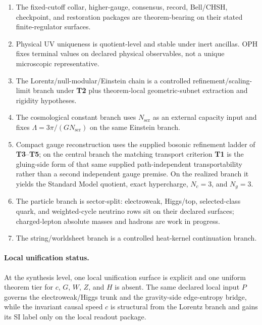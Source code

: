 \begin{enumerate}[leftmargin=2em]
\item The fixed-cutoff collar, higher-gauge, consensus, record, Bell/CHSH, checkpoint, and
restoration packages are theorem-bearing on their stated finite-regulator surfaces.
\item Physical UV uniqueness is quotient-level and stable under inert ancillas. OPH fixes terminal
values on declared physical observables, not a unique microscopic representative.
\item The Lorentz/null-modular/Einstein chain is a controlled refinement/scaling-limit branch
under \textbf{T2} plus theorem-local geometric-subnet extraction and rigidity hypotheses.
\item The cosmological constant branch uses \(N_{\mathrm{scr}}\) as an external capacity input and
fixes \(\Lambda=3\pi/(G N_{\mathrm{scr}})\) on the same Einstein branch.
\item Compact gauge reconstruction uses the supplied bosonic refinement ladder of \textbf{T3}--\textbf{T5}; on the central branch the matching transport criterion \textbf{T1} is the gluing-side form of that same supplied path-independent transportability rather than a second independent gauge premise. On the realized
branch it yields the Standard Model quotient, exact hypercharge, \(N_c=3\), and \(N_g=3\).
\item The particle branch is sector-split: electroweak, Higgs/top, selected-class quark, and
weighted-cycle neutrino rows sit on their declared surfaces; charged-lepton absolute masses and
hadrons are work in progress.
\item The string/worldsheet branch is a controlled heat-kernel continuation branch.
\end{enumerate}

\paragraph{Local unification status.}
At the synthesis level, one local unification surface is explicit and one uniform theorem tier for
\(c\), \(G\), \(W\), \(Z\), and \(H\) is absent. The same declared local input \(P\) governs the
electroweak/Higgs trunk and the gravity-side edge-entropy bridge, while the invariant causal speed
\(c\) is structural from the Lorentz branch and gains its SI label only on the local readout
package.

